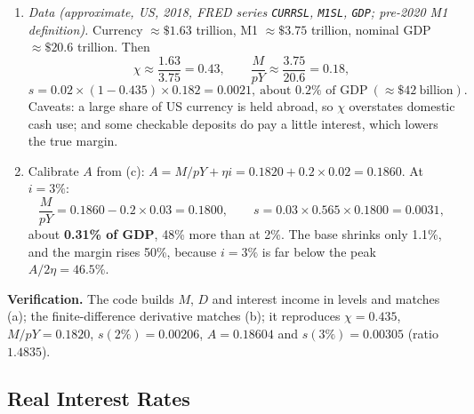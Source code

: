 \documentclass[12pt, letterpaper]{article}
\begin{document}
\begin{tcolorbox}[oddbox,title={Problem 11.7 \quad Bank Seignorage}]
\begin{enumerate}
\item \emph{Data (approximate, US, 2018, FRED series \texttt{CURRSL}, \texttt{M1SL}, \texttt{GDP};
pre-2020 M1 definition).} Currency $\approx\$1.63$ trillion, M1 $\approx\$3.75$ trillion,
nominal GDP $\approx\$20.6$ trillion. Then
\[
\chi\approx\frac{1.63}{3.75}=\boxed{0.43},\qquad
\frac{M}{pY}\approx\frac{3.75}{20.6}=\boxed{0.18},
\]
\[
s=0.02\times(1-0.435)\times0.182=\boxed{0.0021},\ \text{about }0.2\%\text{ of GDP}
\ (\approx\$42\ \text{billion}).
\]
Caveats: a large share of US currency is held abroad, so $\chi$ overstates domestic cash
use; and some checkable deposits do pay a little interest, which lowers the true margin.

\item Calibrate $A$ from (c): $A=M/pY+\eta i=0.1820+0.2\times0.02=0.1860$. At $i=3\%$:
\[
\frac{M}{pY}=0.1860-0.2\times0.03=0.1800,\qquad
s=0.03\times0.565\times0.1800=\boxed{0.0031},
\]
about \textbf{0.31\% of GDP}, 48\% more than at 2\%. The base shrinks only 1.1\%, and the margin
rises 50\%, because $i=3\%$ is far below the peak $A/2\eta=46.5\%$.
\end{enumerate}

\textbf{Verification.} The code builds $M$, $D$ and interest income in levels and matches (a);
the finite-difference derivative matches (b); it reproduces $\chi=0.435$, $M/pY=0.1820$,
$s(2\%)=0.00206$, $A=0.18604$ and $s(3\%)=0.00305$ (ratio $1.4835$). \checkmark
\end{tcolorbox}

\subsection{Real Interest Rates}
\end{document}
